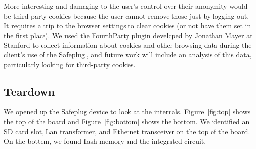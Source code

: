 More interesting and damaging to the user's control over their anonymity would be third-party cookies because the user cannot remove those just by logging out.  It requires a trip to the browser settings to clear cookies (or not have them set in the first place).  We used the FourthParty plugin developed by Jonathan Mayer at Stanford to collect information about cookies and other browsing data during the client's use of the Safeplug \cite{fourthparty}, and future work will include an analysis of this data, particularly looking for third-party cookies.

\subsection{Teardown}
\label{sec:tear}
We opened up the Safeplug device to look at the internals.  Figure~\ref{fig:top} shows the top of the board and Figure~\ref{fig:bottom} shows the bottom.  We identified an SD card slot, Lan transformer, and Ethernet transceiver on the top of the board.  On the bottom, we found flash memory and the integrated circuit.

